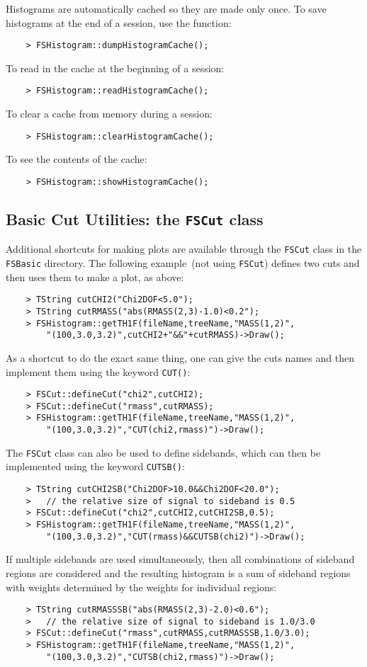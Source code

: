\documentclass[11pt]{article}
\begin{document}
Histograms are automatically cached so they are made only once.  To save histograms at the end of a session, use the function:
\begin{verbatim}
    > FSHistogram::dumpHistogramCache(); 
\end{verbatim}
To read in the cache at the beginning of a session:
\begin{verbatim}
    > FSHistogram::readHistogramCache(); 
\end{verbatim}
To clear a cache from memory during a session:
\begin{verbatim}
    > FSHistogram::clearHistogramCache(); 
\end{verbatim}
To see the contents of the cache:
\begin{verbatim}
    > FSHistogram::showHistogramCache(); 
\end{verbatim}

\subsection{Basic Cut Utilities: the {\tt FSCut} class}
\label{sec:cut}

Additional shortcuts for making plots are available through the {\tt FSCut} class in the {\tt FSBasic} directory.  The following example~(not using {\tt FSCut}) defines two cuts and then uses them to make a plot, as above:
\begin{verbatim}
    > TString cutCHI2("Chi2DOF<5.0");
    > TString cutRMASS("abs(RMASS(2,3)-1.0)<0.2");
    > FSHistogram::getTH1F(fileName,treeName,"MASS(1,2)",
        "(100,3.0,3.2)",cutCHI2+"&&"+cutRMASS)->Draw();
\end{verbatim}
As a shortcut to do the exact same thing, one can give the cuts names and then implement them using the keyword {\tt CUT()}:
\begin{verbatim}
    > FSCut::defineCut("chi2",cutCHI2);
    > FSCut::defineCut("rmass",cutRMASS);
    > FSHistogram::getTH1F(fileName,treeName,"MASS(1,2)",
        "(100,3.0,3.2)","CUT(chi2,rmass)")->Draw();
\end{verbatim}
The {\tt FSCut} class can also be used to define sidebands, which can then be implemented using the keyword {\tt CUTSB()}:
\begin{verbatim}
    > TString cutCHI2SB("Chi2DOF>10.0&&Chi2DOF<20.0");
    >   // the relative size of signal to sideband is 0.5
    > FSCut::defineCut("chi2",cutCHI2,cutCHI2SB,0.5);
    > FSHistogram::getTH1F(fileName,treeName,"MASS(1,2)",
        "(100,3.0,3.2)","CUT(rmass)&&CUTSB(chi2)")->Draw();
\end{verbatim}
If multiple sidebands are used simultaneously, then all combinations of sideband regions are considered and the resulting histogram is a sum of sideband regions with weights determined by the weights for individual regions:
\begin{verbatim}
    > TString cutRMASSSB("abs(RMASS(2,3)-2.0)<0.6");
    >   // the relative size of signal to sideband is 1.0/3.0
    > FSCut::defineCut("rmass",cutRMASS,cutRMASSSB,1.0/3.0);
    > FSHistogram::getTH1F(fileName,treeName,"MASS(1,2)",
        "(100,3.0,3.2)","CUTSB(chi2,rmass)")->Draw();
\end{verbatim}
\end{document}
